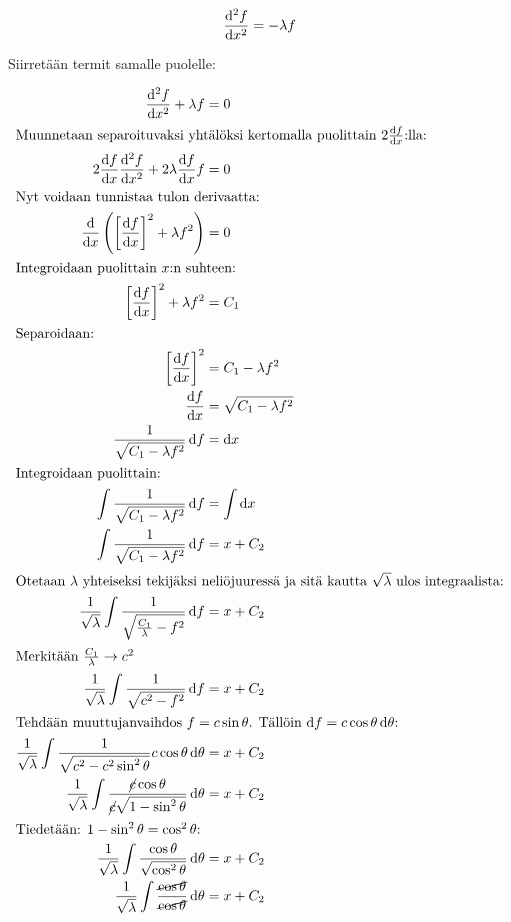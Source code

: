 \documentclass[../johdoksia.tex]{subfiles}
\begin{document}
	\begin{equation}
		\odv{^2f}{x^2} = -\lambda f
	\end{equation}

	Siirretään termit samalle puolelle:
	
	\begin{align*}
		\odv{^2f}{x^2} + \lambda f &= 0 \\
		\intertext{Muunnetaan separoituvaksi yhtälöksi kertomalla puolittain $2\odv{f}{x}$:lla:}
		2\odv{f}{x}\odv{^2f}{x^2} + 2\lambda\odv{f}{x} f &= 0 \\
		\intertext{Nyt voidaan tunnistaa tulon derivaatta:}
		\odv{}{x}\left(\left[\odv{f}{x}\right]^2 + \lambda f^2\right) &= 0 \\
		\intertext{Integroidaan puolittain $x$:n suhteen:}
		\left[\odv{f}{x}\right]^2 + \lambda f^2 &= C_1 \\
		\intertext{Separoidaan:}
		\left[\odv{f}{x}\right]^2 &= C_1 - \lambda f^2 \\
		\odv{f}{x} &= \sqrt{C_1 - \lambda f^2} \\
		\frac{1}{\sqrt{C_1 - \lambda f^2}}\odif{f} &= \odif{x} \\
		\intertext{Integroidaan puolittain:}
		\int\frac{1}{\sqrt{C_1 - \lambda f^2}}\odif{f} &= \int\odif{x} \\
		\int\frac{1}{\sqrt{C_1 - \lambda f^2}}\odif{f} &= x + C_2 \\
		\intertext{Otetaan $\lambda$ yhteiseksi tekijäksi neliöjuuressä ja sitä kautta $\sqrt{\lambda}$ ulos integraalista:}
		\frac{1}{\sqrt{\lambda}}\int\frac{1}{\sqrt{\frac{C_1}{\lambda} - f^2}}\odif{f} &= x + C_2 \\
		\intertext{Merkitään $\frac{C_1}{\lambda} \to c^2$}
		\frac{1}{\sqrt{\lambda}}\int\frac{1}{\sqrt{c^2 - f^2}}\odif{f} &= x + C_2 \\
		\intertext{Tehdään muuttujanvaihdos $f = c\sin\theta$. Tällöin $\odif{f} = c\cos\theta\odif{\theta}$:}
		\frac{1}{\sqrt{\lambda}}\int\frac{1}{\sqrt{c^2 - c^2\sin^2\theta}}c\cos\theta\odif{\theta} &= x + C_2 \\
		\frac{1}{\sqrt{\lambda}}\int\frac{\cancel{c}\cos\theta}{\cancel{c}\sqrt{1 - \sin^2\theta}}\odif{\theta} &= x + C_2 \\
		\intertext{Tiedetään: $1 - \sin^2\theta = \cos^2\theta$:}
		\frac{1}{\sqrt{\lambda}}\int\frac{\cos\theta}{\sqrt{\cos^2\theta}}\odif{\theta} &= x + C_2 \\
		\frac{1}{\sqrt{\lambda}}\int\frac{\cancel{\cos\theta}}{\cancel{\cos\theta}}\odif{\theta} &= x + C_2 \\

\end{align*}
\end{document}
